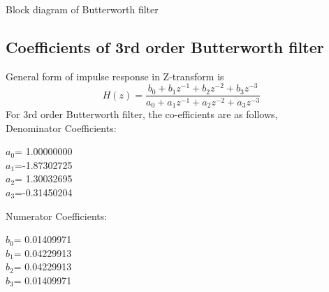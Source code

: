 \documentclass[journal,10pt,twocolumn]{article}
\begin{document}
\begin{flushleft}
\hspace{1cm} Block diagram of Butterworth filter  \\
\end{flushleft}

\subsection{Coefficients of 3rd order Butterworth filter} 
\vspace{0.25cm}
\begin{flushleft}

General form of impulse response in Z-transform is\\
\begin{equation}
H(z)= \frac{b_0 + b_1 z^{-1} + b_2 z^{-2} + b_3 z^{-3}}{a_0 + a_1 z^{-1}+ a_2 z^{-2} + a_3 z^{-3}}
\end{equation}
\vspace{0.25cm}
For 3rd order Butterworth filter, the co-efficients are as follows,\\
\vspace{0.25cm}
Denominator Coefficients:\\
\vspace{0.1cm}
\begin{center}
$a_0$= 1.00000000 \\
\vspace{0.15cm}
$a_1$=-1.87302725 \\ 
\vspace{0.15cm}
$a_2$= 1.30032695 \\
\vspace{0.15cm}
$a_3$=-0.31450204 \\
\end{center}
\vspace{0.35cm}
Numerator Coefficients:\\  
\vspace{0.1cm}
\begin{center}
    
$b_0$= 0.01409971 \\ 
\vspace{0.15cm}
$b_1$= 0.04229913 \\
\vspace{0.15cm}
$b_2$= 0.04229913 \\
\vspace{0.15cm}
$b_3$= 0.01409971 \\
\end{center}
\end{flushleft}
\end{document}
